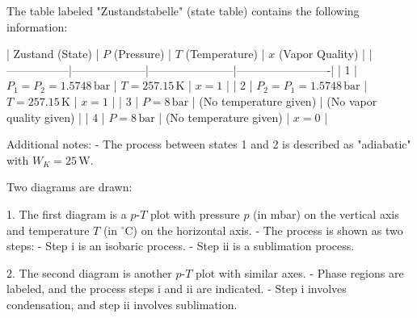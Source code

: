 The table labeled "Zustandstabelle" (state table) contains the following information:  

| Zustand (State) | \( P \) (Pressure) | \( T \) (Temperature) | \( x \) (Vapor Quality) |  
|-----------------|--------------------|-----------------------|-------------------------|  
| 1               | \( P_1 = P_2 = 1.5748 \, \text{bar} \) | \( T = 257.15 \, \text{K} \) | \( x = 1 \) |  
| 2               | \( P_2 = P_1 = 1.5748 \, \text{bar} \) | \( T = 257.15 \, \text{K} \) | \( x = 1 \) |  
| 3               | \( P = 8 \, \text{bar} \) | (No temperature given) | (No vapor quality given) |  
| 4               | \( P = 8 \, \text{bar} \) | (No temperature given) | \( x = 0 \) |  

Additional notes:  
- The process between states 1 and 2 is described as "adiabatic" with \( W_K = 25 \, \text{W} \).

Two diagrams are drawn:  

1. The first diagram is a \( p \)-\( T \) plot with pressure \( p \) (in mbar) on the vertical axis and temperature \( T \) (in \( ^\circ\text{C} \)) on the horizontal axis.  
   - The process is shown as two steps:  
     - Step i is an isobaric process.  
     - Step ii is a sublimation process.  

2. The second diagram is another \( p \)-\( T \) plot with similar axes.  
   - Phase regions are labeled, and the process steps i and ii are indicated.  
   - Step i involves condensation, and step ii involves sublimation.